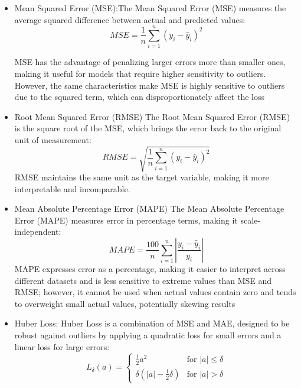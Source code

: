 \begin{itemize}
    \item Mean Squared Error (MSE):The Mean Squared Error (MSE) measures the average squared difference between actual and predicted values:
    \begin{equation}
        MSE = \frac{1}{n} \sum_{i=1}^{n} (y_i - \hat{y}_i)^2 
    \end{equation}
     
    MSE has the advantage of penalizing larger errors more than smaller ones, making it useful for models that require higher sensitivity to outliers. However, the same characteristics make MSE is highly sensitive to outliers due to the squared term, which can disproportionately affect the loss
    \item Root Mean Squared Error (RMSE)
    The Root Mean Squared Error (RMSE) is the square root of the MSE, which brings the error back to the original unit of measurement:
    \begin{equation}
        RMSE = \sqrt{\frac{1}{n} \sum_{i=1}^{n} (y_i - \hat{y}_i)^2} 
    \end{equation} 
    RMSE maintains the same unit as the target variable, making it more interpretable and incomparable. 
    \item Mean Absolute Percentage Error (MAPE)
    The Mean Absolute Percentage Error (MAPE) measures error in percentage terms, making it scale-independent:
    \begin{equation}
        MAPE = \frac{100}{n} \sum_{i=1}^{n} \left| \frac{y_i - \hat{y}_i}{y_i} \right| 
    \end{equation} 
    MAPE expresses error as a percentage, making it easier to interpret across different datasets and is less sensitive to extreme values than MSE and RMSE; however, it cannot be used when actual values contain zero and tends to overweight small actual values, potentially skewing results
    \item Huber Loss: Huber Loss is a combination of MSE and MAE, designed to be robust against outliers by applying a quadratic loss for small errors and a linear loss for large errors:
    \begin{equation}
        L_{\delta}(a) =
        \begin{cases} 
        \frac{1}{2} a^2 & \text{for } |a| \leq \delta \\
        \delta (|a| - \frac{1}{2} \delta) & \text{for } |a| > \delta
        \end{cases}
    \end{equation}

\end{itemize}
